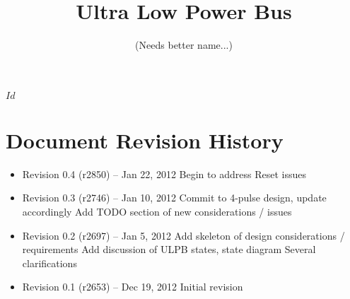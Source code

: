 \documentclass{article}
\newcommand{\bus}{ULPB\xspace}
\begin{document}
\svnInfo $Id$ 

\pagestyle{fancyplain}

\title{Ultra Low Power Bus}
\author{(Needs better name...)}
\date{}
\maketitle

\tableofcontents
\clearpage






\clearpage


\clearpage
\section{Document Revision History}
\label{sec:revisions}

\begin{itemize}

\item Revision 0.4 {\footnotesize(r2850)} -- Jan 22, 2012
\subitem Begin to address Reset issues

\item Revision 0.3 {\footnotesize(r2746)} -- Jan 10, 2012
\subitem Commit to 4-pulse design, update accordingly
\subitem Add TODO section of new considerations / issues

\item Revision 0.2 {\footnotesize(r2697)} -- Jan 5, 2012
\subitem Add skeleton of design considerations / requirements
\subitem Add discussion of \bus states, state diagram
\subitem Several clarifications

\item Revision 0.1 {\footnotesize(r2653)} -- Dec 19, 2012
\subitem Initial revision

\end{itemize}
\end{document}
